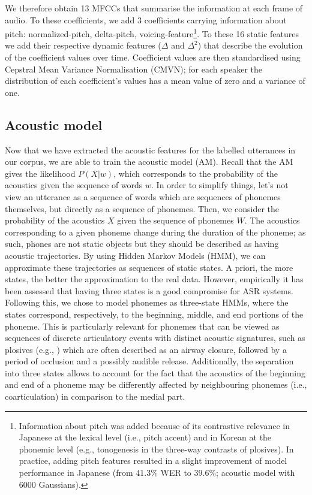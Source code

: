 We therefore obtain 13 MFCCs that summarise the information at each frame of audio. To these coefficients, we add 3 coefficients carrying information about pitch: normalized-pitch, delta-pitch, voicing-feature\footnote{Information about pitch was added because of its contrastive relevance in Japanese at the lexical level (i.e., pitch accent) and in Korean at the phonemic level (e.g., tonogenesis in the three-way contrasts of plosives). In practice, adding pitch features resulted in a slight improvement of model performance in Japanese (from $41.3\%$ WER to $39.6\%$; acoustic model with 6000 Gaussians).}.
To these 16 static features we add their respective dynamic features ($\Delta$ and $\Delta^2$) that describe the evolution of the coefficient values over time. 
Coefficient values are then standardised using Cepstral Mean Variance Normalisation (CMVN); for each speaker the distribution of each coefficient's values has a mean value of zero and a variance of one. 

\subsection{Acoustic model}

Now that we have extracted the acoustic features for the labelled utterances in our corpus, we are able to train the acoustic model (AM). Recall that the AM gives the likelihood $P(X|w)$, which corresponds to the probability of the acoustics given the sequence of words $w$.
In order to simplify things, let's not view an utterance as a sequence of words which are sequences of phonemes themselves, but directly as a sequence of phonemes. Then, we consider the probability of the acoustics $X$ given the sequence of phonemes $W$.
The acoustics corresponding to a given phoneme change during the duration of the phoneme; as such, phones are not static objects but they should be described as having acoustic trajectories. By using Hidden Markov Models (HMM), we can approximate these trajectories as sequences of static states. A priori, the more states, the better the approximation to the real data. However, empirically it has been assessed that having three states is a good compromise for ASR systems. Following this, we chose to model phonemes as three-state HMMs, where the states correspond, respectively, to the beginning, middle, and end portions of the phoneme. This is particularly relevant for phonemes that can be viewed as sequences of discrete articulatory events with distinct acoustic signatures, such as plosives (e.g., ) which are often described as an airway closure, followed by a period of occlusion and a possibly audible release. Additionally, the separation into three states allows to account for the fact that the acoustics of the beginning and end of a phoneme may be differently affected by neighbouring phonemes (i.e., coarticulation) in comparison to the medial part. 

